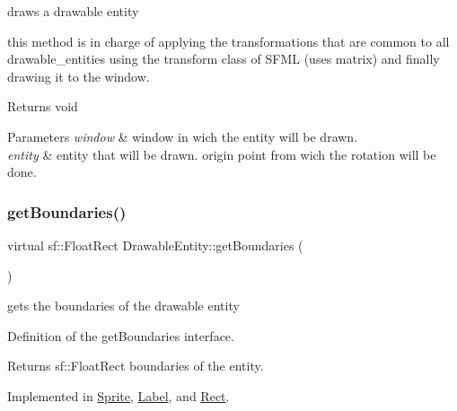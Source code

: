 draws a drawable entity 

this method is in charge of applying the transformations that are common to all drawable\+\_\+entities using the transform class of S\+F\+ML (uses matrix) and finally drawing it to the window.

\begin{DoxyReturn}{Returns}
void 
\end{DoxyReturn}

\begin{DoxyParams}{Parameters}
{\em window} & window in wich the entity will be drawn. \\
\hline
{\em entity} & entity that will be drawn.  origin point from wich the rotation will be done. \\
\hline
\end{DoxyParams}
\mbox{\label{class_drawable_entity_a352a101e3be05d25e1a10e5f72ccb9e3}} 
\subsubsection{\texorpdfstring{get\+Boundaries()}{getBoundaries()}}
{\footnotesize\ttfamily virtual sf\+::\+Float\+Rect Drawable\+Entity\+::get\+Boundaries (\begin{DoxyParamCaption}{ }\end{DoxyParamCaption})\hspace{0.3cm}{\ttfamily [pure virtual]}}



gets the boundaries of the drawable entity 

Definition of the get\+Boundaries interface.

\begin{DoxyReturn}{Returns}
sf\+::\+Float\+Rect boundaries of the entity. 
\end{DoxyReturn}


Implemented in \hyperlink{class_sprite_add63c87af068cdcdb536eb1c82644ab4}{Sprite}, \hyperlink{class_label_a3eb456d7295b3d5af615b3dc6e761f4b}{Label}, and \hyperlink{class_rect_a17056b26af5522b024e9628386d34335}{Rect}.

\mbox{\label{class_drawable_entity_a3893879bf0710a7f5c5e7eb758ad7e96}} 
